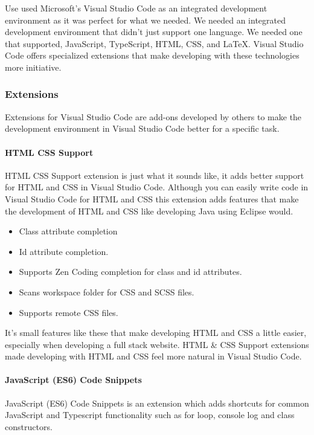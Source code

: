 Use used Microsoft's Visual Studio Code as an integrated development environment as it was perfect for what we needed. We needed an integrated development environment that didn't just support one language. We needed one that supported, JavaScript, TypeScript, HTML, CSS, and LaTeX. Visual Studio Code offers specialized extensions that make developing with these technologies more initiative.

\subsubsection{Extensions}
Extensions for Visual Studio Code are add-ons developed by others to make the development environment in Visual Studio Code better for a specific task.

\paragraph{HTML CSS Support}
HTML CSS Support extension is just what it sounds like, it adds better support for HTML and CSS in Visual Studio Code. Although you can easily write code in Visual Studio Code for HTML and CSS this extension adds features that make the development of HTML and CSS like developing Java using Eclipse would.

\begin{itemize}
    \item Class attribute completion
    \item Id attribute completion.
    \item Supports Zen Coding completion for class and id attributes.
    \item Scans workspace folder for CSS and SCSS files.
    \item Supports remote CSS files.
\end{itemize}

It's small features like these that make developing HTML and CSS a little easier, especially when developing a full stack website. HTML & CSS Support extensions made developing with HTML and CSS feel more natural in Visual Studio Code.

\paragraph{JavaScript (ES6) Code Snippets}
JavaScript (ES6) Code Snippets is an extension which adds shortcuts for common JavaScript and Typescript functionality such as for loop, console log and class constructors.

